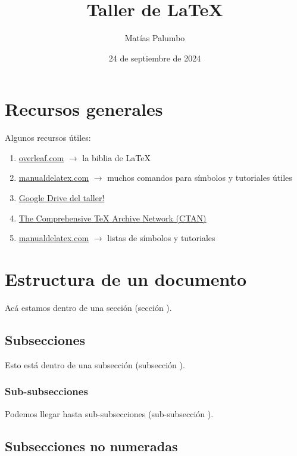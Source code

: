\documentclass[12pt, spanish]{article}
\title{Taller de \LaTeX}
\author{Matías Palumbo}
\date{24 de septiembre de 2024}
\theoremstyle{definition} %
\theoremstyle{remark} %
\theoremstyle{plain} %
\theoremstyle{plain} %
\theoremstyle{plain} %
\theoremstyle{plain} %
\theoremstyle{plain} %
\theoremstyle{remark} %
\begin{document}
\maketitle

\tableofcontents

\pagebreak

\section{Recursos generales}
\noindent Algunos recursos útiles:
\begin{enumerate}
    \item \href{www.overleaf.com}{overleaf.com} $\to$ la biblia de \LaTeX
    \item \href{www.manualdelatex.com}{manualdelatex.com} $\to$ muchos comandos para símbolos y tutoriales útiles
    \item \href{www.drive.google.com/drive/folders/1OXJNANEtlrzC934mgEcmJNUbtBfR32l9?usp=drive_link}{Google Drive del taller!}
    \item \href{https://ctan.org/?lang=en}{The Comprehensive TeX Archive Network (CTAN)}
    \item \href{https://manualdelatex.com/}{manualdelatex.com} $\to$ listas de símbolos y tutoriales
\end{enumerate}



\section{Estructura de un documento}

Acá estamos dentro de una sección (sección \thesection).

\subsection{Subsecciones}

Esto está dentro de una subsección (subsección \thesubsection).

\subsubsection{Sub-subsecciones}

Podemos llegar hasta sub-subsecciones (sub-subsección \thesubsubsection).

\subsection*{Subsecciones no numeradas}
\end{document}
